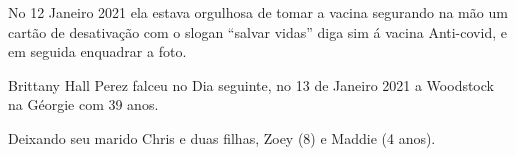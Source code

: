 No 12 Janeiro 2021 ela estava orgulhosa de tomar a vacina segurando na mão um
cartão de desativação com o slogan ``salvar vidas'' diga sim á vacina
Anti-covid, e em seguida enquadrar a foto.

Brittany Hall Perez falceu no Dia seguinte, no 13 de Janeiro 2021 a Woodstock na
Géorgie com 39 anos.

Deixando seu marido Chris e duas filhas, Zoey (8) e Maddie (4 anos).
